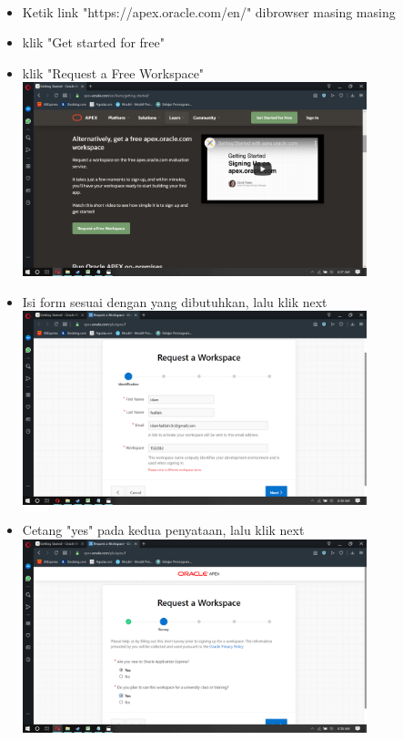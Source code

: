 \documentclass[a4paper,12pt]{report}
\begin{document}
\paragraph{}
\begin{itemize}
	\item Ketik link "https://apex.oracle.com/en/" dibrowser masing masing	
	\item klik "Get started for free"
	\item klik "Request a Free Workspace"\\	\includegraphics[width=10cm]{gambar/Screenshot (106).png} 
	\item Isi form sesuai dengan yang dibutuhkan, lalu klik next\\	\includegraphics[width=10cm]{gambar/Screenshot (108).png} 
	\item Cetang "yes" pada kedua penyataan, lalu klik next\\	\includegraphics[width=10cm]{gambar/Screenshot (109).png} 

\end{itemize}
\end{document}
